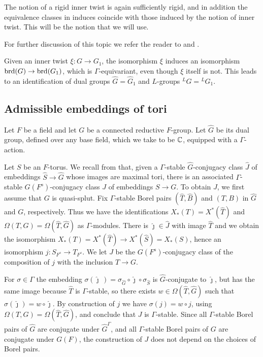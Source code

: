 \documentclass{article}
\theoremstyle{definition}
\numberwithin{equation}{section}
\renewcommand{\-}{\hyp{}}
\begin{document}
The notion of a rigid inner twist is again sufficiently rigid, and in addition the equivalence classes in induces coincide with those induced by the notion of inner twist. This will be the notion that we will use.

For further discussion of this topic we refer the reader to \cite{Vog93} and \cite{KalSimons}.

Given an inner twist $\xi : G \to G_1$, the isomorphism $\xi$ induces an isomorphism $\textrm{brd}(G) \to \textrm{brd}(G_1)$, which is $\Gamma$-equivariant, even though $\xi$ itself is not. This leads to an identification of dual groups $\hat G = \hat G_1$ and $L$\-groups $^LG = {^LG}_1$.


\subsection{Admissible embeddings of tori} \label{sub:adm}

Let $F$ be a field and let $G$ be a connected reductive $F$-group. Let $\hat G$ be its dual group, defined over any base field, which we take to be $\mathbb{C}$, equipped with a $\Gamma$-action.

Let $S$ be an $F$-torus. We recall from \cite[\S5.1]{KalRSP} that, given a $\Gamma$-stable $\hat G$-conjugacy class $\hat J$ of embeddings $\hat S \to \hat G$ whose images are maximal tori, there is an associated $\Gamma$-stable $G(F^s)$-conjugacy class $J$ of embeddings $S \to G$. To obtain $J$, we first assume that $G$ is quasi-splut. Fix $\Gamma$-stable Borel pairs $(\hat T,\hat B)$ and $(T,B)$ in $\hat G$ and $G$, respectively. Thus we have the identifications $X_*(T)=X^*(\hat T)$ and $\Omega(T,G)=\Omega(\hat T,\hat G)$ as $\Gamma$-modules. There is $\hat\jmath \in \hat J$ with image $\hat T$ and we obtain the isomorphism $X_*(T)=X^*(\hat T) \to X^*(\hat S)=X_*(S)$, hence an isomorphism $j : S_{F^s} \to T_{F^s}$. We let $J$ be the $G(F^s)$-conjugacy class of the composition of $j$ with the inclusion $T \to G$.

For $\sigma \in \Gamma$ the embedding $\sigma(\hat\jmath\,)=\sigma_{\hat G}\circ \hat\jmath \circ \sigma_{\hat S}$ is $\hat G$-conjugate to $\hat\jmath$, but has the same image because $\hat T$ is $\Gamma$-stable, so there exists $w \in \Omega(\hat T,\hat G)$ such that $\sigma(\hat\jmath)=w\circ\hat\jmath$. By construction of $j$ we have $\sigma(j)=w\circ j$, using $\Omega(T,G)=\Omega(\hat T,\hat G)$, and conclude that $J$ is $\Gamma$-stable. Since all $\Gamma$-stable Borel pairs of $\hat G$ are conjugate under $\hat G^\Gamma$, and all $\Gamma$-stable Borel pairs of $G$ are conjugate under $G(F)$, the construction of $J$ does not depend on the choices of Borel pairs.
\end{document}
